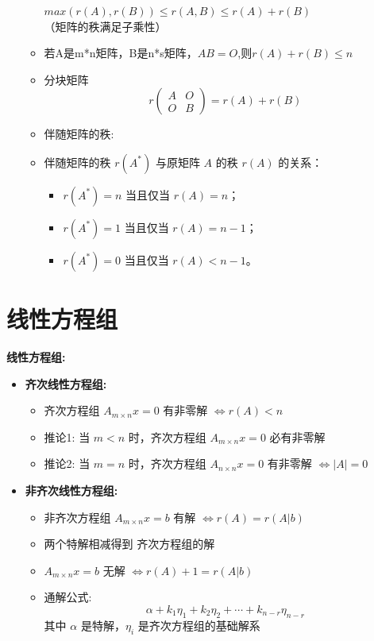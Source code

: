 \documentclass[10pt]{article}
\begin{document}
\begin{multicols}{2}
\begin{itemize}
\begin{itemize}
      \(max(r(A), r(B)) \leq r(A,B) \leq r(A) + r(B)\)\\（矩阵的秩满足子乘性）
      \item 若A是m*n矩阵，B是n*s矩阵，\(AB = O \),则\(r(A) + r(B) \leq n\)
      \item 分块矩阵               
      \[
         r(\begin{matrix} A & O \\ O & B \end{matrix})  = r(A) + r(B)
      \]
      \item 伴随矩阵的秩:
          \item 伴随矩阵的秩 \( r(A^*) \) 与原矩阵 \( A \) 的秩 \( r(A) \) 的关系：
          \begin{itemize}
            \item \( r(A^*) = n \) 当且仅当 \( r(A) = n \)；
            \item \( r(A^*) = 1 \) 当且仅当 \( r(A) = n-1 \)；
            \item \( r(A^*) = 0 \) 当且仅当 \( r(A) < n-1 \)。
          \end{itemize}
    \end{itemize}
\end{itemize}

\section*{线性方程组}

\textbf{线性方程组:}
\begin{itemize}
  \item \textbf{齐次线性方程组:}
    \begin{itemize}
      \item 齐次方程组 \(A_{m \times n} x = 0\) 有非零解 \(\Leftrightarrow r(A) < n\)
      \item 推论1: 当 \(m < n\) 时，齐次方程组 \(A_{m \times n} x = 0\) 必有非零解
      \item 推论2: 当 \(m = n\) 时，齐次方程组 \(A_{n \times n} x = 0\) 有非零解 \(\Leftrightarrow |A| = 0\)
    \end{itemize}
  \item \textbf{非齐次线性方程组:}
    \begin{itemize}
      \item 非齐次方程组 \(A_{m \times n} x = b\) 有解 \(\Leftrightarrow r(A) = r(A|b)\)
      \item 两个特解相减得到 齐次方程组的解
      \item \(A_{m \times n} x = b\) 无解 \(\Leftrightarrow r(A) + 1 = r(A|b)\)
      \item 通解公式:
        \[
        \alpha + k_1 \eta_1 + k_2 \eta_2 + \cdots + k_{n-r} \eta_{n-r}
        \]
        其中 \(\alpha\) 是特解，\(\eta_i\) 是齐次方程组的基础解系
    \end{itemize}
\end{itemize}


\end{multicols}
\end{document}
